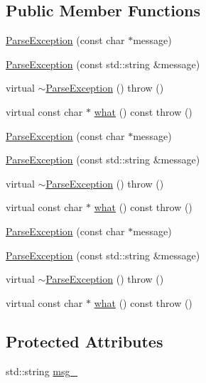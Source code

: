 \subsection*{Public Member Functions}
\begin{DoxyCompactItemize}
\item 
\hyperlink{classParseException_a0e2db737183a1801d528102617ddc3c4}{Parse\+Exception} (const char $\ast$message)
\item 
\hyperlink{classParseException_a162b338172e869ef6e308b4489abf95b}{Parse\+Exception} (const std\+::string \&message)
\item 
virtual \hyperlink{classParseException_a59f11745728ad1ede341f2dda48e79b6}{$\sim$\+Parse\+Exception} ()  throw ()
\item 
virtual const char $\ast$ \hyperlink{classParseException_a7c96d5c467fe71354528570caf9209cd}{what} () const  throw ()
\item 
\hyperlink{classParseException_a0e2db737183a1801d528102617ddc3c4}{Parse\+Exception} (const char $\ast$message)
\item 
\hyperlink{classParseException_a162b338172e869ef6e308b4489abf95b}{Parse\+Exception} (const std\+::string \&message)
\item 
virtual \hyperlink{classParseException_a59f11745728ad1ede341f2dda48e79b6}{$\sim$\+Parse\+Exception} ()  throw ()
\item 
virtual const char $\ast$ \hyperlink{classParseException_a7c96d5c467fe71354528570caf9209cd}{what} () const  throw ()
\item 
\hyperlink{classParseException_a0e2db737183a1801d528102617ddc3c4}{Parse\+Exception} (const char $\ast$message)
\item 
\hyperlink{classParseException_a162b338172e869ef6e308b4489abf95b}{Parse\+Exception} (const std\+::string \&message)
\item 
virtual \hyperlink{classParseException_a59f11745728ad1ede341f2dda48e79b6}{$\sim$\+Parse\+Exception} ()  throw ()
\item 
virtual const char $\ast$ \hyperlink{classParseException_a7c96d5c467fe71354528570caf9209cd}{what} () const  throw ()
\end{DoxyCompactItemize}
\subsection*{Protected Attributes}
\begin{DoxyCompactItemize}
\item 
std\+::string \hyperlink{classParseException_a1e21a45e6538896bb5c71cc7390d986b}{msg\+\_\+}
\end{DoxyCompactItemize}


